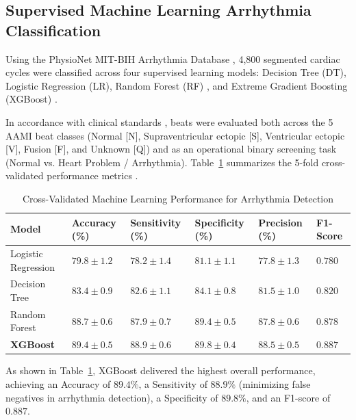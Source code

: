 \subsection{Supervised Machine Learning Arrhythmia Classification}
Using the PhysioNet MIT-BIH Arrhythmia Database \cite{goldberger2000physiobank}, 4,800 segmented cardiac cycles were classified across four supervised learning models: Decision Tree (DT), Logistic Regression (LR), Random Forest (RF) \cite{breiman2001random}, and Extreme Gradient Boosting (XGBoost) \cite{chen2016xgboost}. 

In accordance with clinical standards \cite{pandian2026internet}, beats were evaluated both across the 5 AAMI beat classes (Normal [N], Supraventricular ectopic [S], Ventricular ectopic [V], Fusion [F], and Unknown [Q]) and as an operational binary screening task (Normal vs. Heart Problem / Arrhythmia). Table~\ref{tab:ml_classification_results} summarizes the 5-fold cross-validated performance metrics \cite{sokolova2009systematic}.

\begin{table}[!htbp]
\footnotesize
\centering
\caption{Cross-Validated Machine Learning Performance for Arrhythmia Detection}
\label{tab:ml_classification_results}
\begin{tabular}{|p{2.6cm}|p{1.9cm}|p{1.9cm}|p{1.9cm}|p{1.9cm}|p{1.9cm}|}
\hline
\textbf{Model} & \textbf{Accuracy (\%)} & \textbf{Sensitivity (\%)} & \textbf{Specificity (\%)} & \textbf{Precision (\%)} & \textbf{F1-Score} \\ \hline
Logistic Regression & $79.8 \pm 1.2$ & $78.2 \pm 1.4$ & $81.1 \pm 1.1$ & $77.8 \pm 1.3$ & $0.780$ \\ \hline
Decision Tree & $83.4 \pm 0.9$ & $82.6 \pm 1.1$ & $84.1 \pm 0.8$ & $81.5 \pm 1.0$ & $0.820$ \\ \hline
Random Forest & $88.7 \pm 0.6$ & $87.9 \pm 0.7$ & $89.4 \pm 0.5$ & $87.8 \pm 0.6$ & $0.878$ \\ \hline
\textbf{XGBoost} & $\mathbf{89.4 \pm 0.5}$ & $\mathbf{88.9 \pm 0.6}$ & $\mathbf{89.8 \pm 0.4}$ & $\mathbf{88.5 \pm 0.5}$ & $\mathbf{0.887}$ \\ \hline
\end{tabular}
\end{table}

As shown in Table~\ref{tab:ml_classification_results}, XGBoost delivered the highest overall performance, achieving an Accuracy of $89.4\%$, a Sensitivity of $88.9\%$ (minimizing false negatives in arrhythmia detection), a Specificity of $89.8\%$, and an F1-score of $0.887$. 


